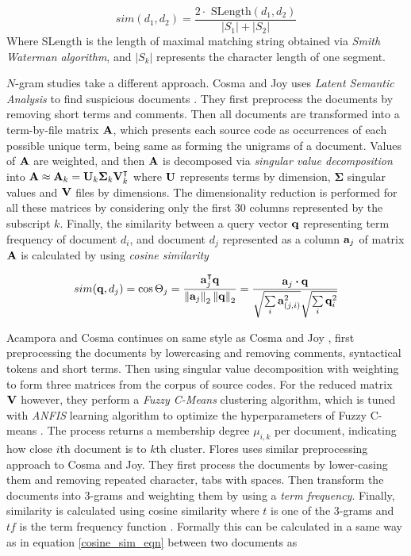 \begin{equation}
    sim(d_1, d_2) = \dfrac{2 \cdot \text{ SLength}(d_1, d_2)}{|S_1| + |S_2|}
\end{equation}
\noindent
Where SLength is the length of maximal matching string obtained via  \emph{Smith Waterman algorithm}, and $|S_k|$ represents the character length of one segment. 


$N$-gram studies take a different approach. Cosma and Joy uses \emph{Latent Semantic Analysis} to find suspicious documents \cite{AASCPD2012}. They first preprocess the documents by removing \eg short terms and comments. Then all documents are transformed into a term-by-file matrix $\mathbf{A}$, which presents each source code as occurrences of each possible unique term, being same as forming the unigrams of a document. Values of $\mathbf{A}$ are weighted, and then $\mathbf{A}$ is decomposed via \emph{singular value decomposition} into $\mathbf{A} \approx \mathbf{A}_k  = \mathbf{U}_k\mathbf{\Sigma}_k\mathbf{V}_k^\intercal$ where $\mathbf{U}$ represents terms by dimension, $\mathbf{\Sigma}$ singular values and $\mathbf{V}$ files by dimensions. The dimensionality reduction is performed for all these matrices by considering only the first 30 columns represented by the subscript $k$. Finally, the similarity between a query vector $\mathbf{q}$ representing term frequency of document $d_i$, and document $d_j$ represented as a column $\mathbf{a}_j$ of matrix $\mathbf{A}$ is calculated by using \emph{cosine similarity} \cite{AASCPD2012}

\begin{equation}\label{cosine_sim_eqn}
    sim(\mathbf{q}, d_j) = \cos \Theta_j = \dfrac{\mathbf{a}_j^\intercal \mathbf{q}}{\left\lVert\mathbf{a}_j\right\rVert_2 \left\lVert\mathbf{q}\right\rVert_2} = \dfrac{\mathbf{a}_j \boldsymbol{\cdot} \mathbf{q}}{\sqrt{\sum \limits_{i} \mathbf{a}_{(j, i)}^2} \sqrt{\sum \limits_{i} \mathbf{q}_i^2}}
\end{equation}

\noindent
Acampora and Cosma \cite{AFAPLI2015} continues on same style as Cosma and Joy \cite{AASCPD2012}, first preprocessing the documents by lowercasing and removing comments, syntactical tokens and short terms. Then using singular value decomposition with weighting to form three matrices from the corpus of source codes. For the reduced matrix $\mathbf{V}$ however, they perform a \emph{Fuzzy C-Means} clustering algorithm, which is tuned with \emph{ANFIS} learning algorithm to optimize the hyperparameters of Fuzzy C-means \cite{AFAPLI2015}. The process returns a membership degree $\mu_{i, k}$ per document, indicating how close $i$th document is to $k$th cluster. 
\noindent
Flores \etal \cite{USCR2014} uses similar preprocessing approach to Cosma and Joy. They first process the documents by lower-casing them and removing repeated character, tabs with spaces. Then transform the documents into $3$-grams and weighting them by using a \emph{term frequency}. Finally, similarity is calculated using cosine similarity where $t$ is one of the 3-grams and $tf$ is the term frequency function \cite{USCR2014}. Formally this can be calculated in a same way as in equation \ref{cosine_sim_eqn} between two documents as

